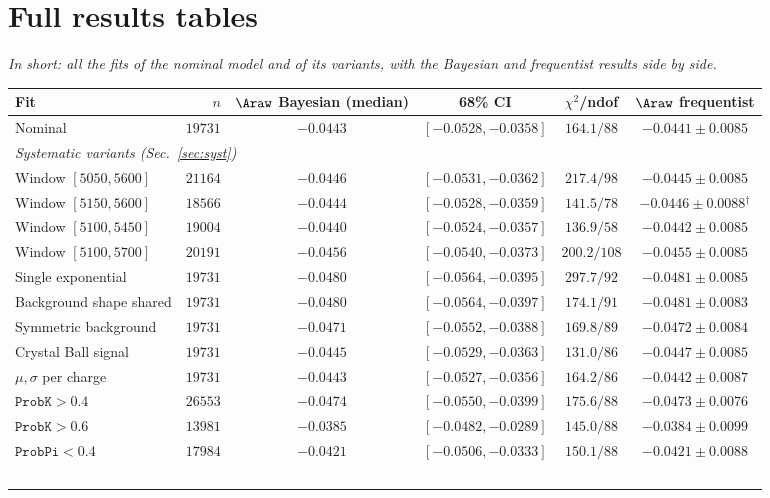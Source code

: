 \appendix
\section{Full results tables}
\label{sec:appendix}
\emph{In short: all the fits of the nominal model and of its variants, with the Bayesian and frequentist results side by side.}

\begin{table}[t]
\centering
\begin{tabular}{lrccc|c}
\toprule
Fit & $n$ & $\Araw$ Bayesian (median) & 68\% CI & $\chi^2$/ndof & $\Araw$ frequentist \\
\midrule
Nominal & $19731$ & $-0.0443$ & $[-0.0528,-0.0358]$ & $164.1/88$ & $-0.0441\pm0.0085$ \\
\multicolumn{6}{l}{\emph{Systematic variants (Sec.~\ref{sec:syst})}} \\
Window $[5050,5600]$ & $21164$ & $-0.0446$ & $[-0.0531,-0.0362]$ & $217.4/98$ & $-0.0445\pm0.0085$ \\
Window $[5150,5600]$ & $18566$ & $-0.0444$ & $[-0.0528,-0.0359]$ & $141.5/78$ & $-0.0446\pm0.0088$$^\dagger$ \\
Window $[5100,5450]$ & $19004$ & $-0.0440$ & $[-0.0524,-0.0357]$ & $136.9/58$ & $-0.0442\pm0.0085$ \\
Window $[5100,5700]$ & $20191$ & $-0.0456$ & $[-0.0540,-0.0373]$ & $200.2/108$ & $-0.0455\pm0.0085$ \\
Single exponential & $19731$ & $-0.0480$ & $[-0.0564,-0.0395]$ & $297.7/92$ & $-0.0481\pm0.0085$ \\
Background shape shared & $19731$ & $-0.0480$ & $[-0.0564,-0.0397]$ & $174.1/91$ & $-0.0481\pm0.0083$ \\
Symmetric background & $19731$ & $-0.0471$ & $[-0.0552,-0.0388]$ & $169.8/89$ & $-0.0472\pm0.0084$ \\
Crystal Ball signal & $19731$ & $-0.0445$ & $[-0.0529,-0.0363]$ & $131.0/86$ & $-0.0447\pm0.0085$ \\
$\mu,\sigma$ per charge & $19731$ & $-0.0443$ & $[-0.0527,-0.0356]$ & $164.2/86$ & $-0.0442\pm0.0087$ \\
$\texttt{ProbK}>0.4$ & $26553$ & $-0.0474$ & $[-0.0550,-0.0399]$ & $175.6/88$ & $-0.0473\pm0.0076$ \\
$\texttt{ProbK}>0.6$ & $13981$ & $-0.0385$ & $[-0.0482,-0.0289]$ & $145.0/88$ & $-0.0384\pm0.0099$ \\
$\texttt{ProbPi}<0.4$ & $17984$ & $-0.0421$ & $[-0.0506,-0.0333]$ & $150.1/88$ & $-0.0421\pm0.0088$ \\
$$
\end{tabular}
\end{table}
